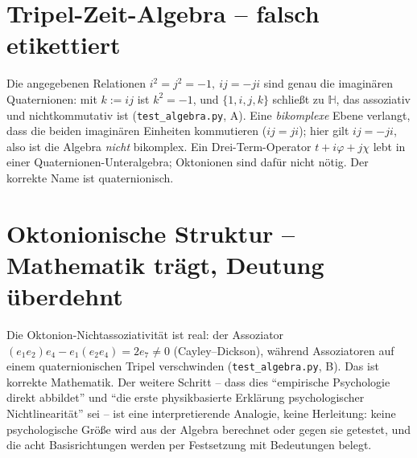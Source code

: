 \section{Tripel-Zeit-Algebra -- falsch etikettiert}\label{sec:alg}
Die angegebenen Relationen $i^2=j^2=-1,\ ij=-ji$ sind genau die imaginären Quaternionen:
mit $k:=ij$ ist $k^2=-1$, und $\{1,i,j,k\}$ schließt zu $\mathbb{H}$, das assoziativ und
nichtkommutativ ist (\texttt{test\_algebra.py}, A). Eine \emph{bikomplexe} Ebene verlangt,
dass die beiden imaginären Einheiten kommutieren ($ij=ji$); hier gilt $ij=-ji$, also ist
die Algebra \emph{nicht} bikomplex. Ein Drei-Term-Operator $t+i\varphi+j\chi$ lebt in einer
Quaternionen-Unteralgebra; Oktonionen sind dafür nicht nötig. Der korrekte Name ist
quaternionisch.

\section{Oktonionische Struktur -- Mathematik trägt, Deutung überdehnt}
Die Oktonion-Nichtassoziativität ist real: der Assoziator
$(e_1e_2)e_4-e_1(e_2e_4)=2e_7\neq0$ (Cayley--Dickson), während Assoziatoren auf einem
quaternionischen Tripel verschwinden (\texttt{test\_algebra.py}, B). Das ist korrekte
Mathematik. Der weitere Schritt -- dass dies ``empirische Psychologie direkt abbildet'' und
``die erste physikbasierte Erklärung psychologischer Nichtlinearität'' sei -- ist eine
interpretierende Analogie, keine Herleitung: keine psychologische Größe wird aus der
Algebra berechnet oder gegen sie getestet, und die acht Basisrichtungen werden per
Festsetzung mit Bedeutungen belegt.

